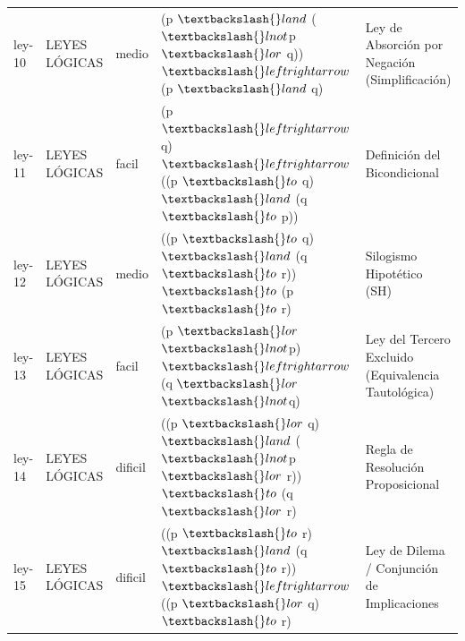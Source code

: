 \documentclass[11pt,a4paper,openany]{book}
\begin{document}
\begin{center}
\begin{longtable}{lllll}
ley-10 & LEYES LÓGICAS & medio & (p $ \textbackslash\{\}land $ ($ \textbackslash\{\}lnot $p $ \textbackslash\{\}lor $ q)) $ \textbackslash\{\}leftrightarrow $ (p $ \textbackslash\{\}land $ q) & Ley de Absorción por Negación (Simplificación) \\
ley-11 & LEYES LÓGICAS & facil & (p $ \textbackslash\{\}leftrightarrow $ q) $ \textbackslash\{\}leftrightarrow $ ((p $ \textbackslash\{\}to $ q) $ \textbackslash\{\}land $ (q $ \textbackslash\{\}to $ p)) & Definición del Bicondicional \\
ley-12 & LEYES LÓGICAS & medio & ((p $ \textbackslash\{\}to $ q) $ \textbackslash\{\}land $ (q $ \textbackslash\{\}to $ r)) $ \textbackslash\{\}to $ (p $ \textbackslash\{\}to $ r) & Silogismo Hipotético (SH) \\
ley-13 & LEYES LÓGICAS & facil & (p $ \textbackslash\{\}lor $ $ \textbackslash\{\}lnot $p) $ \textbackslash\{\}leftrightarrow $ (q $ \textbackslash\{\}lor $ $ \textbackslash\{\}lnot $q) & Ley del Tercero Excluido (Equivalencia Tautológica) \\
ley-14 & LEYES LÓGICAS & dificil & ((p $ \textbackslash\{\}lor $ q) $ \textbackslash\{\}land $ ($ \textbackslash\{\}lnot $p $ \textbackslash\{\}lor $ r)) $ \textbackslash\{\}to $ (q $ \textbackslash\{\}lor $ r) & Regla de Resolución Proposicional \\
ley-15 & LEYES LÓGICAS & dificil & ((p $ \textbackslash\{\}to $ r) $ \textbackslash\{\}land $ (q $ \textbackslash\{\}to $ r)) $ \textbackslash\{\}leftrightarrow $ ((p $ \textbackslash\{\}lor $ q) $ \textbackslash\{\}to $ r) & Ley de Dilema / Conjunción de Implicaciones \\
\bottomrule
\end{longtable}
\end{center}
\end{document}
